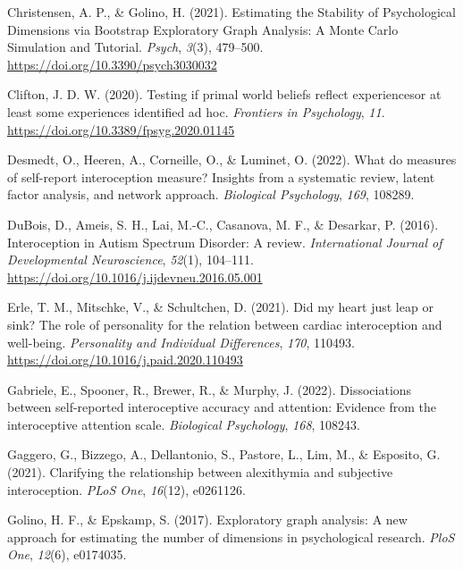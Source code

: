 \documentclass[
  man,
  floatsintext,
  longtable,
  nolmodern,
  notxfonts,
  notimes,
  colorlinks=true,linkcolor=blue,citecolor=blue,urlcolor=blue]{apa7}
\newlength{\cslhangindent}
\newenvironment{CSLReferences}[2] %
 {\begin{list}{}{%
  \setlength{\itemindent}{0pt}
  \setlength{\leftmargin}{0pt}
  \setlength{\parsep}{0pt}
  \ifodd #1
   \setlength{\leftmargin}{\cslhangindent}
   \setlength{\itemindent}{-1\cslhangindent}
  \fi
  \setlength{\itemsep}{#2\baselineskip}}}
 {\end{list}}
\begin{document}
\begin{CSLReferences}{1}{0}
Christensen, A. P., \& Golino, H. (2021). Estimating the Stability of
Psychological Dimensions via Bootstrap Exploratory Graph Analysis: A
Monte Carlo Simulation and Tutorial. \emph{Psych}, \emph{3}(3),
479--500. \url{https://doi.org/10.3390/psych3030032}

Clifton, J. D. W. (2020). Testing if primal world beliefs reflect
experiences{\textemdash}or at least some experiences identified ad hoc.
\emph{Frontiers in Psychology}, \emph{11}.
\url{https://doi.org/10.3389/fpsyg.2020.01145}

Desmedt, O., Heeren, A., Corneille, O., \& Luminet, O. (2022). What do
measures of self-report interoception measure? Insights from a
systematic review, latent factor analysis, and network approach.
\emph{Biological Psychology}, \emph{169}, 108289.

DuBois, D., Ameis, S. H., Lai, M.-C., Casanova, M. F., \& Desarkar, P.
(2016). Interoception in Autism Spectrum Disorder: A review.
\emph{International Journal of Developmental Neuroscience},
\emph{52}(1), 104--111.
\url{https://doi.org/10.1016/j.ijdevneu.2016.05.001}

Erle, T. M., Mitschke, V., \& Schultchen, D. (2021). Did my heart just
leap or sink? The role of personality for the relation between cardiac
interoception and well-being. \emph{Personality and Individual
Differences}, \emph{170}, 110493.
\url{https://doi.org/10.1016/j.paid.2020.110493}

Gabriele, E., Spooner, R., Brewer, R., \& Murphy, J. (2022).
Dissociations between self-reported interoceptive accuracy and
attention: Evidence from the interoceptive attention scale.
\emph{Biological Psychology}, \emph{168}, 108243.

Gaggero, G., Bizzego, A., Dellantonio, S., Pastore, L., Lim, M., \&
Esposito, G. (2021). Clarifying the relationship between alexithymia and
subjective interoception. \emph{PLoS One}, \emph{16}(12), e0261126.

Golino, H. F., \& Epskamp, S. (2017). Exploratory graph analysis: A new
approach for estimating the number of dimensions in psychological
research. \emph{PloS One}, \emph{12}(6), e0174035.


\end{CSLReferences}
\end{document}

